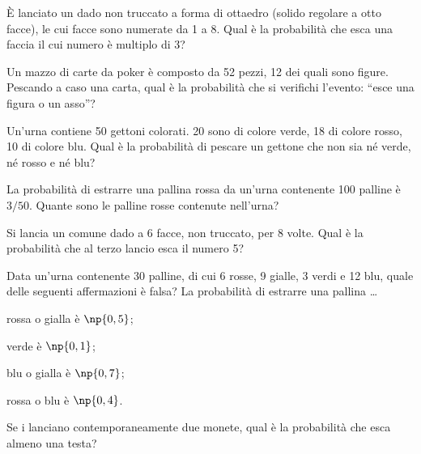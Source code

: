 \begin{esercizio} %
È lanciato un dado non truccato a forma di ottaedro (solido regolare a otto facce), le cui facce sono numerate da 1 a 8. Qual è la probabilità che esca una faccia il cui numero è multiplo di 3?
\end{esercizio}

\begin{esercizio} %
Un mazzo di carte da poker è composto da 52 pezzi, 12 dei quali sono figure. Pescando a caso una carta, qual è la probabilità che si verifichi l'evento: ``esce una figura o un asso''?
\end{esercizio}

\begin{esercizio} %
Un'urna contiene 50 gettoni colorati. 20 sono di colore verde, 18 di colore rosso, 10 di colore blu. Qual è la probabilità di pescare un gettone che non sia né verde, né rosso e né blu?
\end{esercizio}

\begin{esercizio} %
La probabilità di estrarre una pallina rossa da un'urna contenente 100 palline è $3/50$. Quante sono le palline rosse contenute nell'urna?
\end{esercizio}

\begin{esercizio} %
Si lancia un comune dado a 6 facce, non truccato, per 8 volte. Qual è la probabilità che al terzo lancio esca il numero 5?
\end{esercizio}

\begin{esercizio} %
Data un'urna contenente 30 palline, di cui 6 rosse, 9 gialle, 3 verdi e 12 blu, quale delle seguenti affermazioni è falsa? La probabilità di estrarre una pallina \ldots
\begin{itemize*}
\item rossa o gialla è $\np{0,5}$;
\item verde è $\np{0,1}$;
\item blu o gialla è $\np{0,7}$;
\item rossa o blu è $\np{0,4}$.
\end{itemize*}
\end{esercizio}

\begin{esercizio} %
Se i lanciano contemporaneamente due monete, qual è la probabilità che esca almeno una testa?
\end{esercizio}

